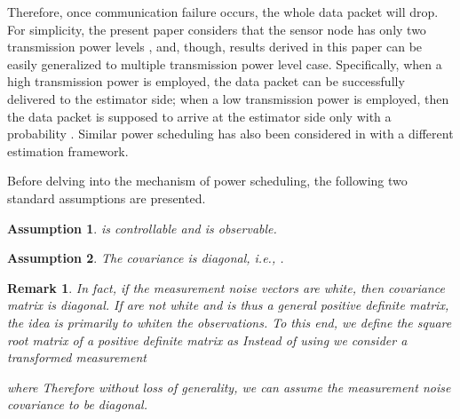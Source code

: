 \documentclass[journal]{IEEEtran}
\newtheorem{assumption}{Assumption}
\newtheorem{remark}{Remark}
\begin{document}
{} Therefore, once communication failure occurs, the whole data packet will drop. {\color{black}For simplicity, the present paper considers that the sensor node has only two transmission power levels \cite{auto2011shi}, \cite{tsp2012shixie} and, though, results derived in this paper can be easily generalized to multiple transmission power level case. Specifically, when a high transmission power  is employed, the data packet can be successfully delivered to the estimator side; when a low transmission power  is employed, then the data packet is supposed to arrive at the estimator side only with a probability . Similar power scheduling has also been considered in \cite{tsp2012shixie} with a different estimation framework.}


Before delving into the mechanism of power scheduling, the following two standard assumptions are presented.
\begin{assumption}\label{assumption 4}
 is controllable and  is observable.
\end{assumption}
\begin{assumption}\label{assumption 1}
The covariance  is diagonal, i.e., .
\end{assumption}

{\color{black}\begin{remark}
In fact, if the measurement noise vectors  are white, then covariance matrix  is diagonal. If  are not white and  is thus a general positive definite matrix, the idea is primarily to whiten the observations. To this end, we define the square root matrix of a positive definite matrix  as  Instead of using  we consider a transformed measurement

where  Therefore without loss of generality, we can assume the measurement noise covariance  to be diagonal.
\end{remark}}
\end{document}
